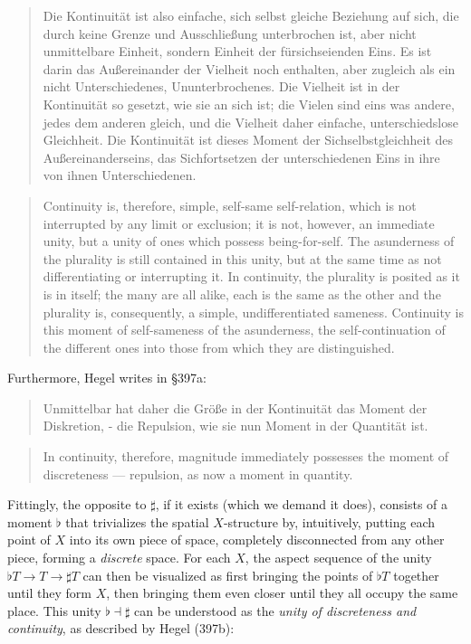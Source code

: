 \documentclass{article}
\begin{document}
\begin{quote}
    Die Kontinuität ist also einfache, sich selbst gleiche Beziehung auf sich, die durch keine Grenze und Ausschließung unterbrochen ist, aber nicht unmittelbare Einheit, sondern Einheit der fürsichseienden Eins. Es ist darin das Außereinander der Vielheit noch enthalten, aber zugleich als ein nicht Unterschiedenes, Ununterbrochenes. Die Vielheit ist in der Kontinuität so gesetzt, wie sie an sich ist; die Vielen sind eins was andere, jedes dem anderen gleich, und die Vielheit daher einfache, unterschiedslose Gleichheit. Die Kontinuität ist dieses Moment der Sichselbstgleichheit des Außereinanderseins, das Sichfortsetzen der unterschiedenen Eins in ihre von ihnen Unterschiedenen.
\end{quote}

\begin{quote}
    Continuity is, therefore, simple, self-same self-relation, which is not interrupted by any limit or exclusion; it is not, however, an immediate unity, but a unity of ones which possess being-for-self. The asunderness of the plurality is still contained in this unity, but at the same time as not differentiating or interrupting it. In continuity, the plurality is posited as it is in itself; the many are all alike, each is the same as the other and the plurality is, consequently, a simple, undifferentiated sameness. Continuity is this moment of self-sameness of the asunderness, the self-continuation of the different ones into those from which they are distinguished.
\end{quote}

Furthermore, Hegel writes in §397a:

\begin{quote}
    Unmittelbar hat daher die Größe in der Kontinuität das Moment der Diskretion, - die Repulsion, wie sie nun Moment in der Quantität ist.
\end{quote}

\begin{quote}
    In continuity, therefore, magnitude immediately possesses the moment of discreteness — repulsion, as now a moment in quantity.
\end{quote}

Fittingly, the opposite to $\sharp$, if it exists (which we demand it does), consists of a moment $\flat$  that trivializes the spatial $X$-structure by, intuitively, putting each point of $X$ into its own piece of space, completely disconnected from any other piece, forming a \emph{discrete} space. For each $X$, the aspect sequence of the unity $\flat T \rightarrow T \rightarrow \sharp T$ can then be visualized as first bringing the points of $\flat T$ together until they form $X$, then bringing them even closer until they all occupy the same place. This unity $\flat\dashv\sharp$ can be understood as the \emph{unity of discreteness and continuity}, as described by Hegel (397b):
\end{document}
